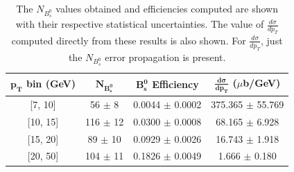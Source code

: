 \begin{table}[htbp] \begin{center}\begin{tabular}{|c|c|c|c|}\hline\textbf{$\mathbf{p_T}$ bin (GeV)} & \textbf{$\mathbf{N_{B_s^{0}}}$} & \textbf{$\mathbf{B_s^{0}}$ Efficiency} & \textbf{${\mathbf{\frac{d \sigma}{dp_T}}}$ ($\mu$b/GeV)} \\\hline{[}7, 10{]} &  56  $\pm$  8 &   0.0044  $\pm$  0.0002 &   375.365  $\pm$  55.769 \\{[}10, 15{]} &  116  $\pm$  12 &   0.0300  $\pm$  0.0008 &   68.165  $\pm$  6.928 \\{[}15, 20{]} &  89  $\pm$  10 &   0.0929  $\pm$  0.0026 &   16.743  $\pm$  1.918 \\{[}20, 50{]} &  104  $\pm$  11 &   0.1826  $\pm$  0.0049 &   1.666  $\pm$  0.180 \\\hline\end{tabular}\caption{The $N_{B_s^{0}}$ values obtained and efficiencies computed are shown with their respective statistical uncertainties. The value of ${\frac{d \sigma}{dp_T}}$ computed directly from these results is also shown. For ${\frac{d \sigma}{dp_T}}$, just the $N_{B_s^{0}}$ error propagation is present.}\label{table:result_raw_fdfu}\end{center}\end{table}



